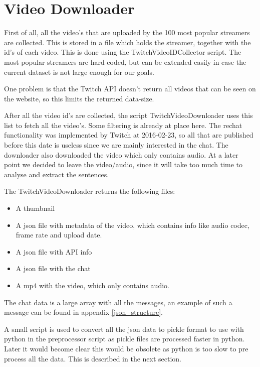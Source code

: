 \documentclass[final]{report}
\begin{document}
\section{Video Downloader}
First of all, all the video's that are uploaded by the 100 most popular streamers are collected. This is stored in a file which holds the streamer, together with the id's of each video.
This is done using the TwitchVideoIDCollector script. The most popular streamers are hard-coded, but can be extended easily in case the current dataset is not large enough for our goals.

One problem is that the Twitch API doesn't return all videos that can be seen on the website, so this limits the returned data-size.

After all the video id's are collected, the script TwitchVideoDownloader uses this list to fetch all the video's.
Some filtering is already at place here. The rechat functionality was implemented by Twitch at 2016-02-23, so all that are published before this date is useless since we are mainly interested in the chat.
The downloader also downloaded the video which only contains audio. At a later point we decided to leave the video/audio, since it will take too much time to analyse and extract the sentences.

The TwitchVideoDownloader returns the following files:
\begin{itemize}
\item A thumbnail
\item A json file with metadata of the video, which contains info like audio codec, frame rate and upload date.
\item A json file with API info
\item A json file with the chat
\item A mp4 with the video, which only contains audio.
\end{itemize}

The chat data is a large array with all the messages, an example of such a message can be found in appendix \ref{json_structure}.

A small script is used to convert all the json data to pickle format to use with python in the preprocessor script as pickle files are processed faster in python. Later it would become clear this would be obsolete as python is too slow to pre process all the data. This is described in the next section.

\clearpage
\end{document}
